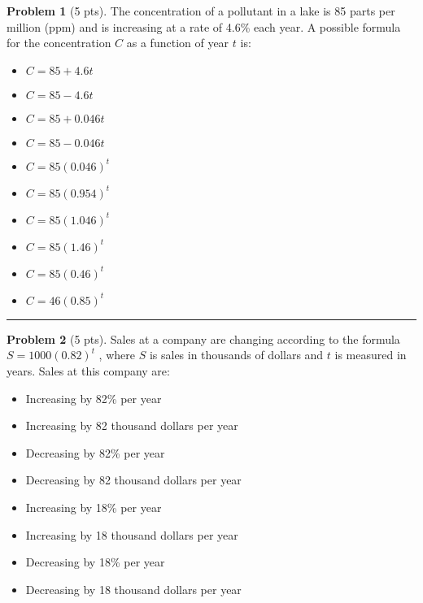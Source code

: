 \documentclass[12pt]{article}
\makeatletter
\theoremstyle{definition}
\newtheorem{problem}{Problem}
\newcommand*{\radiobutton}{%
  \@ifstar{\@radiobutton0}{\@radiobutton1}%
}
\newcommand*{\@radiobutton}[1]{%
  \begin{tikzpicture}
    \pgfmathsetlengthmacro\radius{height("X")/2}
    \draw[radius=\radius] circle;
    \ifcase#1 \fill[radius=.6*\radius] circle;\fi
  \end{tikzpicture}%
}
\makeatother
\begin{document}
\begin{problem}[5 pts]
  The concentration of a pollutant in a lake is 85 parts per million (ppm) and is increasing at a rate of 4.6\% each
  year. A possible formula for the concentration $C$ as a function of year $t$ is: 
  \begin{itemize}
  \item[\radiobutton] $C = 85 + 4.6t$
  \item[\radiobutton] $C = 85 - 4.6t$
  \item[\radiobutton] $C = 85 + 0.046t$
  \item[\radiobutton] $C = 85 - 0.046t$
  \item[\radiobutton] $C = 85(0.046)^t$
  \item[\radiobutton] $C = 85(0.954)^t$
  \item[\radiobutton] $C = 85(1.046)^t$
  \item[\radiobutton] $C = 85(1.46)^t$
  \item[\radiobutton] $C = 85(0.46)^t$
  \item[\radiobutton] $C = 46(0.85)^t$
  \end{itemize}
\end{problem}
\hrule

\begin{problem}[5 pts]
  Sales at a company are changing according to the formula $S = 1000 (0.82)^t$ , where $S$ is sales in thousands of
  dollars and $t$ is measured in years. Sales at this company are: 
  \begin{itemize}
  \item[\radiobutton] Increasing by 82\% per year
  \item[\radiobutton] Increasing by 82 thousand dollars per year
  \item[\radiobutton] Decreasing by 82\% per year
  \item[\radiobutton] Decreasing by 82 thousand dollars per year
  \item[\radiobutton] Increasing by 18\% per year
  \item[\radiobutton] Increasing by 18 thousand dollars per year
  \item[\radiobutton] Decreasing by 18\% per year
  \item[\radiobutton] Decreasing by 18 thousand dollars per year
  \end{itemize} 
\end{problem}
\end{document}
